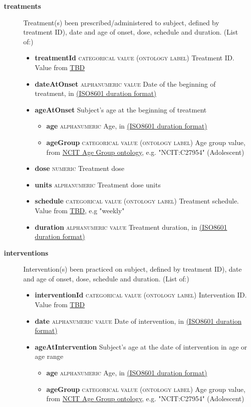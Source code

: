 \documentclass[a4paper, 10pt]{article}        %
\begin{document}
\begin{description}
	\item[\textbf{treatments}] Treatment(s) been prescribed/administered to subject, defined by treatment ID), date and age of onset, dose, schedule and duration. (List of:)
	\begin{itemize}
			\item[] \textbf{treatmentId} {\textsc{categorical value (ontology label)}} Treatment ID. Value from \href{link}{TBD}
			\item[] \textbf{dateAtOnset} {\textsc{alphanumeric value}} Date of the beginning of treatment, in \href{link}{(ISO8601 duration format)}  
			\item[] \textbf{ageAtOnset} Subject's age at the beginning of treatment
			\begin{itemize}
			\item[] \textbf{age} {\textsc{alphanumeric}} Age, in \href{link}{(ISO8601 duration format)}  
			\item[] \textbf{ageGroup} {\textsc{categorical value (ontology label)}} Age group value, from \href{link}{NCIT Age Group ontology}, e.g. "NCIT:C27954" (Adolescent)
			\end{itemize}
			\item[] \textbf{dose} {\textsc{numeric}} Treatment dose
			\item[] \textbf{units}  {\textsc{alphanumeric}} Treatment dose units
			\item[] \textbf{schedule} {\textsc{categorical value (ontology label)}} Treatment schedule. Value from \href{link}{TBD}, e.g "weekly"
			\item[] \textbf{duration} {\textsc{alphanumeric value}} Treatment duration, in \href{link}{(ISO8601 duration format)}  
	\end{itemize} 
	
	\item[\textbf{interventions}] Intervention(s) been practiced on subject, defined by treatment ID), date and age of onset, dose, schedule and duration. (List of:)
	\begin{itemize}
			\item[] \textbf{interventionId} {\textsc{categorical value (ontology label)}} Intervention ID. Value from \href{link}{TBD}
			\item[] \textbf{date} {\textsc{alphanumeric value}} Date of intervention, in \href{link}{(ISO8601 duration format)}			\item[] \textbf{ageAtIntervention} Subject's age at the date of intervention in age or age range
			\begin{itemize}
			\item[] \textbf{age} {\textsc{alphanumeric}} Age, in \href{link}{(ISO8601 duration format)}  
			\item[] \textbf{ageGroup} {\textsc{categorical value (ontology label)}} Age group value, from \href{link}{NCIT Age Group ontology}, e.g. "NCIT:C27954" (Adolescent)
			\end{itemize}
	\end{itemize} 


\end{description}
\end{document}
